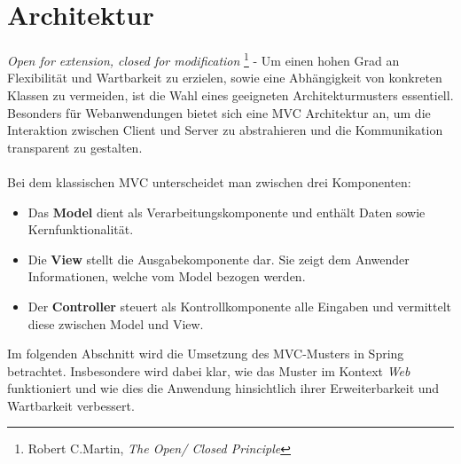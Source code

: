 \section{Architektur}

\textit{Open for extension, closed for modification} \footnote{Robert C.Martin, \textit{The Open/
Closed Principle}} - Um einen hohen Grad an Flexibilität und Wartbarkeit zu erzielen, sowie eine 
Abhängigkeit von konkreten Klassen zu vermeiden, ist die Wahl eines geeigneten Architekturmusters 
essentiell. Besonders für Webanwendungen bietet sich eine \ac{MVC} Architektur an, um die 
Interaktion zwischen Client und Server zu abstrahieren und die Kommunikation transparent zu gestalten.
\\\\
Bei dem klassischen \acs{MVC} unterscheidet man zwischen drei Komponenten:
\begin{itemize}
  \item Das \textbf{Model} dient als Verarbeitungskomponente und enthält Daten sowie Kernfunktionalität.
  \item Die \textbf{View} stellt die Ausgabekomponente dar. Sie zeigt dem Anwender Informationen, welche vom Model bezogen werden.
  \item Der \textbf{Controller} steuert als Kontrollkomponente alle Eingaben und vermittelt diese zwischen Model und View.
\end{itemize}
Im folgenden Abschnitt wird die Umsetzung des \acs{MVC}-Musters in Spring betrachtet. Insbesondere wird 
dabei klar, wie das Muster im Kontext \textit{Web} funktioniert und wie dies die Anwendung hinsichtlich 
ihrer Erweiterbarkeit und Wartbarkeit verbessert.
